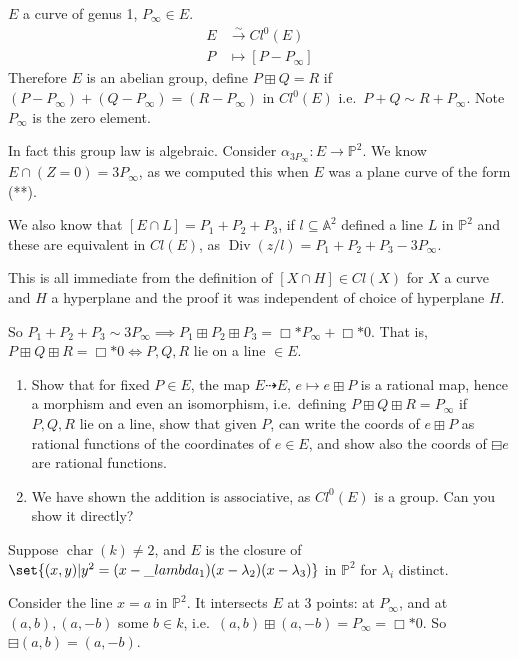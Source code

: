 \documentclass{article}
\newcommand{\A}{\mathbb{A}}
\newcommand{\proj}{\mathbb{P}}
\DeclareMathOperator{\chara}{char}
\DeclareMathOperator{\Div}{Div}
\begin{document}
$E$ a curve of genus 1, $P_\infty \in E$.
\begin{align*}
    E &\xrightarrow{\sim} Cl^0(E) \\
    P &\mapsto [P-P_\infty]
\end{align*}
Therefore $E$ is an abelian group, define $P \boxplus Q = R$ if $(P - P_\infty) + (Q - P_\infty) = (R - P_\infty)$ in $Cl^0(E)$ i.e.\ $P + Q \sim R + P_\infty$.
Note $P_\infty$ is the zero element. %

In fact this group law is algebraic.
Consider $\alpha_{3 P_\infty}: E \to \proj^2$. We know $E \cap (Z=0) = 3P_\infty$, as we computed this when $E$ was a plane curve of the form (**).

We also know that $[E \cap L] = P_1 + P_2 + P_3$, if $l \subseteq \A^2$ defined a line $L$ in $\proj^2$ and these are equivalent in $Cl(E)$, as $\Div(z/l) = P_1 + P_2 + P_3 - 3 P_\infty$.

This is all immediate from the definition of $[X \cap H] \in Cl(X)$ for $X$ a curve and $H$ a hyperplane and the proof it was independent of choice of hyperplane $H$.

So $P_1 + P_2 + P_3 \sim 3 P_\infty \implies P_1 \boxplus P_2 \boxplus P_3 = \Box*{P_\infty} + \Box*{0}$.
That is, $P \boxplus Q \boxplus R = \Box*{0} \iff P, Q, R$ lie on a line $\in E$.
\begin{ex}\leavevmode
    \begin{enumerate}[label=(\roman*)]
        \item Show that for fixed $P \in E$, the map $E \dashrightarrow E$, $e \mapsto e \boxplus P$
            is a rational map, hence a morphism and even an isomorphism, i.e.\ defining $P \boxplus Q \boxplus R = P_\infty$ if $P, Q, R$ lie on a line, show that given $P$, can write the coords of $e \boxplus P$ as rational functions of the coordinates of $e \in E$, and show also the coords of $\boxminus e$ are rational functions.
        \item We have shown the addition is associative, as $Cl^0(E)$ is a group. Can you show it directly?
    \end{enumerate}
\end{ex}
Suppose $\chara(k) \neq 2$, and $E$ is the closure of $\set{(x, y) | y^2 = (x - \_lambda_1) (x-\lambda_2) (x-\lambda_3)}$ in $\proj^2$ for $\lambda_i$ distinct.

Consider the line $x = a$ in $\proj^2$. It intersects $E$ at 3 points: at $P_\infty$, and at $(a, b), (a, -b)$ some $b \in k$, i.e.\ $(a, b) \boxplus (a, -b) = P_\infty = \Box*{0}$.
So $\boxminus (a, b) = (a, -b)$.
\end{document}
